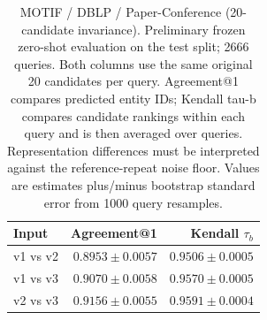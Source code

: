 \begin{table}[t]
\centering
\small
\begin{tabular}{lrr}
\toprule
Input & Agreement@1 & Kendall $\tau_b$ \\
\midrule
v1 vs v2 & $0.8953 \pm 0.0057$ & $0.9506 \pm 0.0005$ \\
v1 vs v3 & $0.9070 \pm 0.0058$ & $0.9570 \pm 0.0005$ \\
v2 vs v3 & $0.9156 \pm 0.0055$ & $0.9591 \pm 0.0004$ \\
\bottomrule
\end{tabular}
\caption{MOTIF / DBLP / Paper-Conference (20-candidate invariance). Preliminary frozen zero-shot evaluation on the test split; 2666 queries. Both columns use the same original 20 candidates per query. Agreement@1 compares predicted entity IDs; Kendall tau-b compares candidate rankings within each query and is then averaged over queries. Representation differences must be interpreted against the reference-repeat noise floor. Values are estimates plus/minus bootstrap standard error from 1000 query resamples.}
\label{tab:motif-paper_conference-invariance}
\end{table}
